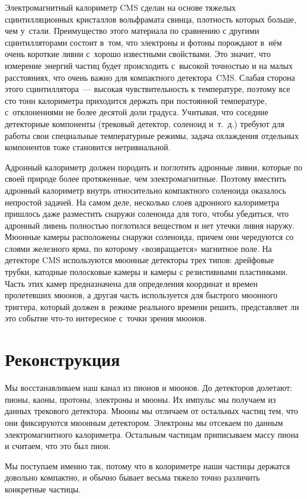 \documentclass[12pt]{kiarticle}
\begin{document}
	Электромагнитный калориметр CMS сделан на основе тяжелых сцинтилляционных кристаллов вольфрамата свинца, плотность которых больше, чем у стали. Преимущество этого материала по сравнению с другими сцинтилляторами состоит в том, что электроны и фотоны порождают в нём очень короткие ливни с хорошо известными свойствами. Это значит, что измерение энергий частиц будет происходить с высокой точностью и на малых расстояниях, что очень важно для компактного детектора CMS. Слабая сторона этого сцинтиллятора — высокая чувствительность к температуре, поэтому все сто тонн калориметра приходится держать при постоянной температуре, с отклонениями не более десятой доли градуса. Учитывая, что соседние детекторные компоненты (трековый детектор, соленоид и т. д.) требуют для работы свои специальные температурные режимы, задача охлаждения отдельных компонентов тоже становится нетривиальной.
	
	Адронный калориметр должен породить и поглотить адронные ливни, которые по своей природе более протяженные, чем электромагнитные. Поэтому вместить адронный калориметр внутрь относительно компактного соленоида оказалось непростой задачей. На самом деле, несколько слоев адронного калориметра пришлось даже разместить снаружи соленоида для того, чтобы убедиться, что адронный ливень полностью поглотился веществом и нет утечки ливня наружу.
	Мюонные камеры расположены снаружи соленоида, причем они чередуются со слоями железного ярма, по которому «возвращается» магнитное поле. На детекторе CMS используются мюонные детекторы трех типов: дрейфовые трубки, катодные полосковые камеры и камеры с резистивными пластинками. Часть этих камер предназначена для определения координат и времен пролетевших мюонов, а другая часть используется для быстрого мюонного триггера, который должен в режиме реального времени решить, представляет ли это событие что-то интересное с точки зрения мюонов.
	
\section{Реконструкция}
Мы восстанавливаем наш канал из пионов и мюонов. До детекторов долетают: пионы, каоны, протоны, электроны и мюоны. Их импульс мы получаем из данных трекового детектора. Мюоны мы отличаем от остальных частиц тем, что они фиксируются мюонным детектором. Электроны мы отсекаем по данным электромагнитного калориметра. Остальным частицам приписываем массу пиона и считаем, что это был пион.

Мы поступаем именно так, потому что в колориметре наши частицы держатся довольно компактно, и обычно бывает весьма тяжело точно различить конкретные частицы.
\end{document}
